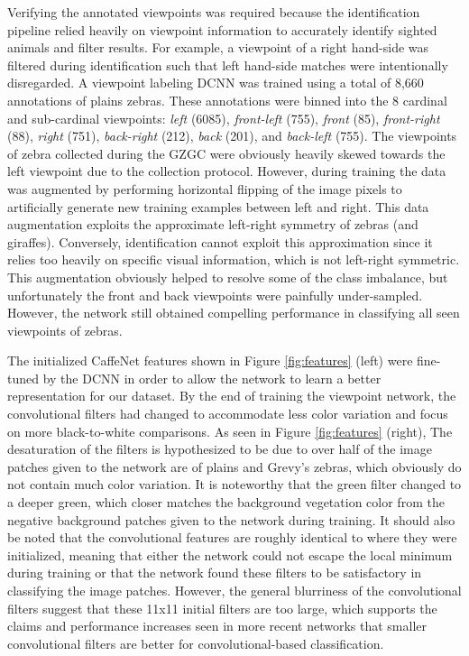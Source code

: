 Verifying the annotated viewpoints was required because the identification pipeline relied heavily on viewpoint information to accurately identify sighted animals and filter results.  For example, a viewpoint of a right hand-side was filtered during identification such that left hand-side matches were intentionally disregarded.  A viewpoint labeling DCNN was trained using a total of 8,660 annotations of plains zebras.  These annotations were binned into the 8 cardinal and sub-cardinal viewpoints: \textit{left} (6085), \textit{front-left} (755), \textit{front} (85), \textit{front-right} (88), \textit{right} (751), \textit{back-right} (212), \textit{back} (201), and \textit{back-left} (755).  The viewpoints of zebra collected during the GZGC were obviously heavily skewed towards the left viewpoint due to the collection protocol.  However, during training the data was augmented by performing horizontal flipping of the image pixels to artificially generate new training examples between left and right.  This data augmentation exploits the approximate left-right symmetry of zebras (and giraffes).  Conversely, identification cannot exploit this approximation since it relies too heavily on specific visual information, which is not left-right symmetric.  This augmentation obviously helped to resolve some of the class imbalance, but unfortunately the front and back viewpoints were painfully under-sampled.  However, the network still obtained compelling performance in classifying all seen viewpoints of zebras.

The initialized CaffeNet features shown in Figure \ref{fig:features} (left) were fine-tuned by the DCNN in order to allow the network to learn a better representation for our dataset.  By the end of training the viewpoint network, the convolutional filters had changed to accommodate less color variation and focus on more black-to-white comparisons.  As seen in Figure \ref{fig:features} (right), The desaturation of the filters is hypothesized to be due to over half of the image patches given to the network are of plains and Grevy's zebras, which obviously do not contain much color variation.  It is noteworthy that the green filter changed to a deeper green, which closer matches the background vegetation color from the negative background patches given to the network during training.  It should also be noted that the convolutional features are roughly identical to where they were initialized, meaning that either the network could not escape the local minimum during training or that the network found these filters to be satisfactory in classifying the image patches.  However, the general blurriness of the convolutional filters suggest that these 11x11 initial filters are too large, which supports the claims and performance increases seen in more recent networks \cite{bengio_advances_2013, sermanet_overfeat:_2013, simonyan_very_2014, springenberg_striving_2014, szegedy_going_2014} that smaller convolutional filters are better for convolutional-based classification.

